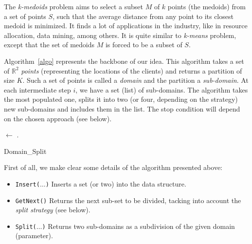 The \textit{k-medoids} problem aims to select a subset $M$ of $k$ points (the medoids) from a set of points $S$, such that the average distance from any point to its closest medoid is minimized. It finds a lot of applications in the industry, like in resource allocation, data mining, among others. It is quite similar to \textit{k-means} problem, except that the set of medoids $M$ is forced to be a subset of $S$.

Algorithm~\ref{algo} represents the backbone of our idea. This algorithm takes a set of $\mathbb{R}^2$ {\it points} (representing the locations of the clients) and returns a partition of size $K$. Such a set of points is called a {\it domain} and the partition a {\it sub-domain}. At each intermediate step $i$, we have a set (list) of sub-domains. The algorithm takes the most populated one, splits it into two (or four, depending on the strategy) new sub-domains and includes them in the list. The stop condition will depend on the chosen approach (see below).

\incmargin{1.4em}
\linesnumbered
\begin{algorithm}
\dontprintsemicolon
\SetLine
{}

\BlankLine

\A $\leftarrow$ \Uni\;
\Q .\Insert{\A}\;
\caption{Domain\_Split}
\label{algo}
\end{algorithm}

First of all, we make clear some details of the algorithm presented above:

\begin{itemize}
\item \texttt{Insert($\dots$)} Inserts a set (or two) into the data structure. %
\item \texttt{GetNext()} Returns the next sub-set to be divided, tacking into account the {\it split strategy} (see below).
\item \texttt{Split($\dots$)} Returns two sub-domains as a subdivision of the given domain (parameter).
\end{itemize}

